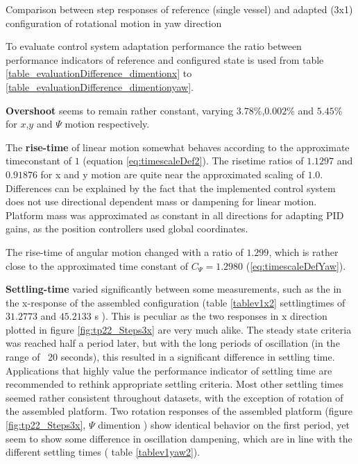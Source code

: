 \begin{table}[H]
	\centering
	\captionsetup{justification=centering}
	
	\caption{Comparison between step responses of reference (single vessel) and adapted (3x1) configuration of rotational motion in yaw direction}
	\label{table_evaluationDifference_dimentionyaw}
\end{table}

To evaluate control system adaptation performance the ratio between performance indicators of reference and configured state is used from table \ref{table_evaluationDifference_dimentionx} to \ref{table_evaluationDifference_dimentionyaw}. 

\textbf{Overshoot} seems to remain rather constant, varying $3.78\%$,$0.002\%$ and $5.45\%$ for $ x$,$y$ and $\Psi$ motion respectively. 

The \textbf{rise-time} of linear motion somewhat behaves according to the approximate timeconstant of $1$ (equation \ref{eq:timescaleDef2}). The risetime ratios of $1.1297$ and $0.91876$ for x and y motion are quite near the approximated scaling of $1.0$. Differences can be explained by the fact that the implemented control system does not use directional dependent mass or dampening for linear motion. Platform mass was approximated as constant in all directions for adapting PID gains, as the position controllers used global coordinates. 

The rise-time of angular motion changed with a ratio of $1.299$, which is rather close to the approximated time constant of $C_{\Psi}  = 1.2980$ (\ref{eq:timescaleDefYaw}).

\textbf{Settling-time} varied significantly between some measurements, such as the in the x-response of the assembled configuration (table \ref{tablev1x2} settlingtimes of $31.2773$ and $45.2133$ s ). This is peculiar as the two responses in x direction plotted in figure \ref{fig:tp22_Steps3x} are very much alike. The steady state criteria was reached half a period later, but with the long periods of oscillation (in the range of ~20 seconds), this resulted in a significant difference in settling time. Applications that highly value the performance indicator of settling time are recommended to rethink appropriate settling criteria. 
Most other settling times seemed rather consistent throughout datasets, with the exception of rotation of the assembled platform. Two rotation responses of the assembled platform (figure \ref{fig:tp22_Steps3x}, $\Psi$ dimention ) show identical behavior on the first period, yet seem to show some difference in oscillation dampening, which are in line with the different settling times ( table \ref{tablev1yaw2}).

